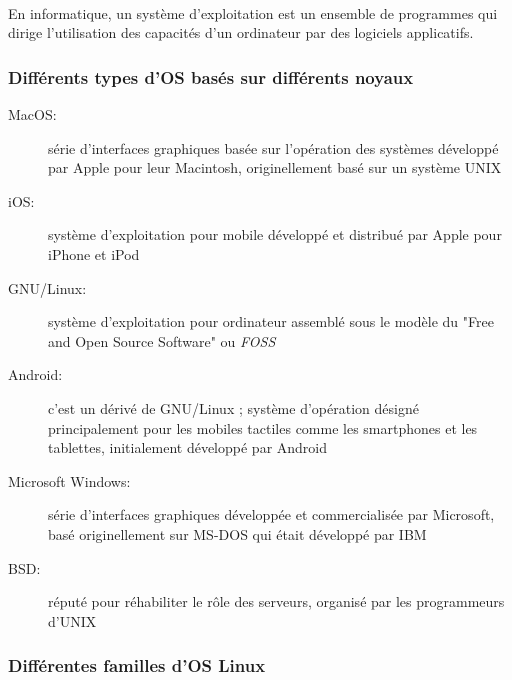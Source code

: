 \paragraph{} En informatique, un système d'exploitation est un ensemble de
programmes qui dirige l'utilisation des capacités d'un ordinateur par des
logiciels applicatifs.

\subsubsection*{Différents types d'OS basés sur différents noyaux}

\begin{description}
	\item[MacOS:] série d'interfaces graphiques basée sur l'opération des
		systèmes développé par Apple pour leur Macintosh, originellement basé
		sur un système UNIX
	\item[iOS:] système d'exploitation pour mobile développé et distribué par
		Apple pour iPhone et iPod
	\item[GNU/Linux:] système d'exploitation pour ordinateur
		assemblé sous le modèle du "Free and Open Source Software" ou
		\textit{FOSS}
	\item[Android:] c'est un dérivé de GNU/Linux ; système d'opération désigné
		principalement pour les mobiles tactiles comme les smartphones
		et les tablettes, initialement développé par Android
	\item[Microsoft Windows:] série d'interfaces graphiques développée et
		commercialisée par Microsoft, basé originellement sur MS-DOS qui était
		développé par IBM
	\item[BSD:] réputé pour réhabiliter le rôle des serveurs, organisé par
		les programmeurs d'UNIX
\end{description}


\subsubsection*{Différentes familles d'OS Linux}


